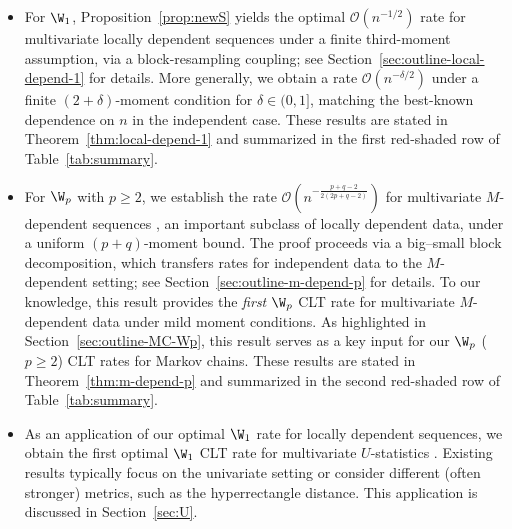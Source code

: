 \documentclass[mnsc,nonblindrev]{informs3}
\begin{document}
\begin{itemize}
\item For \(\W_1\), Proposition~\ref{prop:newS} yields the optimal
\(\mathcal O(n^{-1/2})\) rate for multivariate locally dependent sequences under a finite third-moment assumption, via a block-resampling coupling; see Section~\ref{sec:outline-local-depend-1} for details. More generally, we obtain a rate $\mathcal{O}(n^{-\delta/2})$
under a finite $(2+\delta)$-moment condition for $\delta \in (0,1]$, matching the best-known dependence on $n$ in
the independent case. These results are stated in Theorem~\ref{thm:local-depend-1} and summarized in the first red-shaded row of
Table~\ref{tab:summary}.
\item For \(\W_p\) with \(p \ge 2\), we establish the rate $\mathcal O(n^{-\frac{p+q-2}{2(2p+q-2)}})$ for multivariate \(M\)-dependent sequences
\citep{romano2000more,diananda1955central}, an important subclass of locally dependent data, under a uniform \((p+q)\)-moment bound. The proof proceeds via a big--small block decomposition, which transfers rates for independent data to the \(M\)-dependent setting; see Section~\ref{sec:outline-m-depend-p} for details. To our knowledge, this result provides the
\emph{first} $\W_p$ CLT rate for multivariate $M$-dependent data under mild moment conditions.
As highlighted in Section~\ref{sec:outline-MC-Wp}, this result serves as a key input for our
$\W_p$ ($p\ge 2$) CLT rates for Markov chains. These results are stated in Theorem~\ref{thm:m-depend-p} and summarized in the second red-shaded row of
Table~\ref{tab:summary}.
\item As an application of our optimal $\W_1$ rate for locally dependent sequences, we
obtain the first optimal $\W_1$ CLT rate for multivariate $U$-statistics
\citep{hoeffding1992class}. Existing results typically focus on the univariate
setting or consider different (often stronger) metrics, such as the
hyperrectangle distance. This application is discussed in Section~\ref{sec:U}.





\end{itemize}
\end{document}
